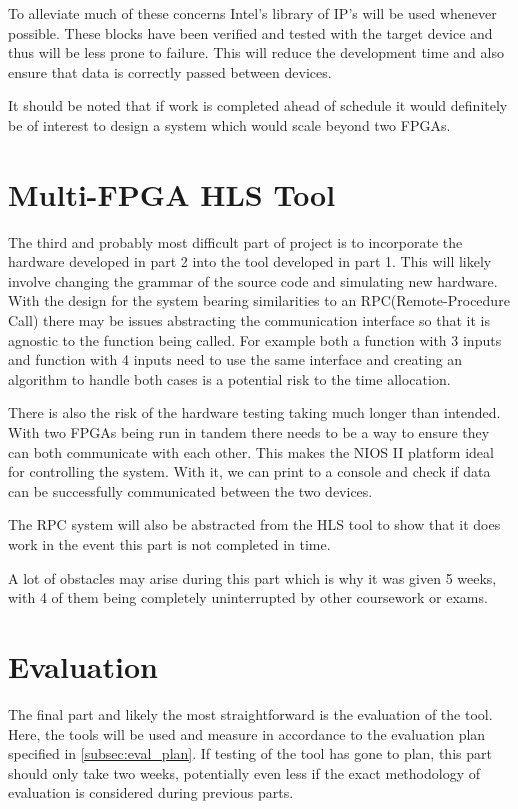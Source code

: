 To alleviate much of these concerns Intel's library of IP's will be used whenever possible. These blocks have been verified and tested with the target device and thus will be less prone to failure. This will reduce the development time and also ensure that data is correctly passed between devices.

It should be noted that if work is completed ahead of schedule it would definitely be of interest to design a system which would scale beyond two FPGAs.

\section{Multi-FPGA HLS Tool}

The third and probably most difficult part of project is to incorporate the hardware developed in part 2 into the tool developed in part 1. This will likely involve changing the grammar of the source code and simulating new hardware. With the design for the system bearing similarities to an RPC(Remote-Procedure Call) there may be issues abstracting the communication interface so that it is agnostic to the function being called. For example both a function with 3 inputs and function with 4 inputs need to use the same interface and creating an algorithm to handle both cases is a potential risk to the time allocation.

There is also the risk of the hardware testing taking much longer than intended. With two FPGAs being run in tandem there needs to be a way to ensure they can both communicate with each other. This makes the NIOS II platform ideal for controlling the system. With it, we can print to a console and check if data can be successfully communicated between the two devices.

The RPC system will also be abstracted from the HLS tool to show that it does work in the event this part is not completed in time.

A lot of obstacles may arise during this part which is why it was given 5 weeks, with 4 of them being completely uninterrupted by other coursework or exams.



\section{Evaluation}

The final part and likely the most straightforward is the evaluation of the tool. Here, the tools will be used and measure in accordance to the evaluation plan specified in \autoref{subsec:eval_plan}. If testing of the tool has gone to plan, this part should only take two weeks, potentially even less if the exact methodology of evaluation is considered during previous parts.

